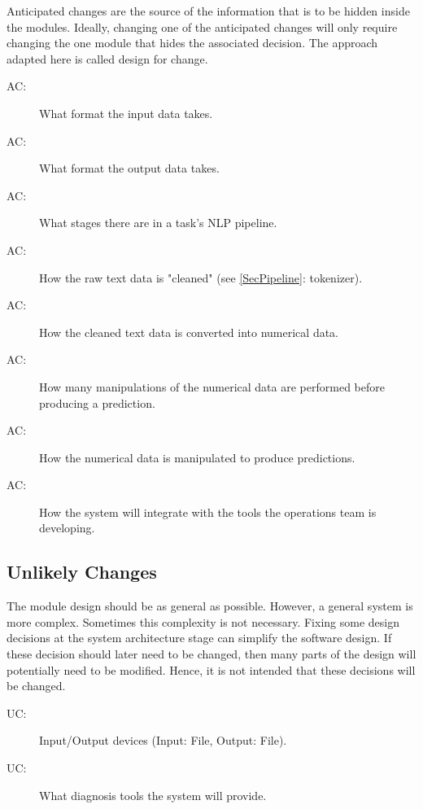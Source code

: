 \documentclass[12pt, titlepage]{article}
\newcounter{acnum}
\newcommand{\actheacnum}{AC\theacnum}
\newcounter{ucnum}
\newcommand{\uctheucnum}{UC\theucnum}
\begin{document}
Anticipated changes are the source of the information that is to be hidden
inside the modules. Ideally, changing one of the anticipated changes will only
require changing the one module that hides the associated decision. The approach
adapted here is called design for
change.

\begin{description}
\item[ \actheacnum \label{acInput}:] What format the input data takes.
\item[ \actheacnum \label{acOutput}:] What format the output data takes.
\item[ \actheacnum \label{acPipelineStages}:] What stages there are in a task's NLP pipeline.
\item[ \actheacnum \label{acTokenization}:] How the raw text data is "cleaned" (see \ref{SecPipeline}: tokenizer).
\item[ \actheacnum \label{acRepModel}:] How the cleaned text data is converted into numerical data.
\item[ \actheacnum \label{acPredModel}:] How many manipulations of the numerical data are performed before producing a prediction.
\item[ \actheacnum \label{acTrans}:] How the numerical data is manipulated to produce predictions.
\item[ \actheacnum \label{acOps}:] How the system will integrate with the tools the operations team is developing.
\end{description}

\subsection{Unlikely Changes} \label{SecUchange}

The module design should be as general as possible. However, a general system is
more complex. Sometimes this complexity is not necessary. Fixing some design
decisions at the system architecture stage can simplify the software design. If
these decision should later need to be changed, then many parts of the design
will potentially need to be modified. Hence, it is not intended that these
decisions will be changed.

\begin{description}
\item[ \uctheucnum \label{ucIO}:] Input/Output devices
  (Input: File, Output: File).
\item[ \uctheucnum \label{ucTasks}:] What diagnosis tools the system will provide.
\end{description}
\end{document}
